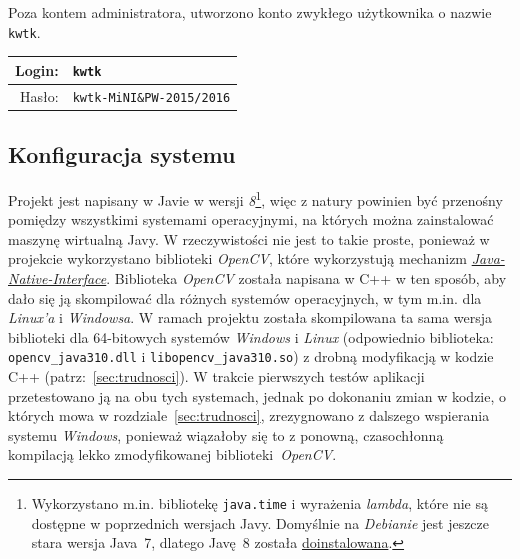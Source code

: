 \documentclass[a4paper,titlepage]{article}
\theoremstyle{break}
\numberwithin{equation}{subsection}
\begin{document}
Poza kontem administratora, utworzono konto zwykłego użytkownika o nazwie \texttt{kwtk}.

\begin{tabular}{r|l}
Login: & \texttt{kwtk}\\
\hline
Hasło: & \texttt{kwtk-MiNI\&PW-2015/2016}\\
\end{tabular}


\subsection{Konfiguracja systemu}

Projekt jest napisany w Javie w wersji \emph{8}\footnote{Wykorzystano m.in. bibliotekę \texttt{java.time} i wyrażenia \emph{lambda}, które nie są dostępne w poprzednich wersjach Javy. Domyślnie na \emph{Debianie} jest jeszcze stara wersja Java~7, dlatego Javę~8 została \href{http://www.webupd8.org/2014/03/how-to-install-oracle-java-8-in-debian.html}{doinstalowana}.}, więc z natury powinien być przenośny pomiędzy wszystkimi systemami operacyjnymi, na których można zainstalować maszynę wirtualną Javy. W rzeczywistości nie jest to takie proste, ponieważ w projekcie wykorzystano biblioteki \emph{OpenCV}, które wykorzystują mechanizm \href{https://en.wikipedia.org/wiki/Java_Native_Interface}{\emph{Java-Native-Interface}}. Biblioteka \emph{OpenCV} została napisana w C++ w ten sposób, aby dało się ją skompilować dla różnych systemów operacyjnych, w tym m.in. dla \emph{Linux'a} i \emph{Windowsa}. W ramach projektu została skompilowana ta sama wersja biblioteki dla 64-bitowych systemów \emph{Windows} i \emph{Linux} (odpowiednio biblioteka: \texttt{opencv\_java310.dll} i \texttt{libopencv\_java310.so}) z drobną modyfikacją w kodzie C++ (patrz:~\ref{sec:trudnosci}). W trakcie pierwszych testów aplikacji przetestowano ją na obu tych systemach, jednak po dokonaniu zmian w kodzie, o których mowa w rozdziale~\ref{sec:trudnosci}, zrezygnowano z dalszego wspierania systemu \emph{Windows}, ponieważ wiązałoby się to z ponowną, czasochłonną kompilacją lekko zmodyfikowanej biblioteki~\emph{OpenCV}.
\end{document}
